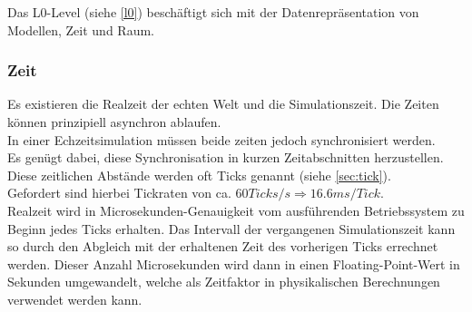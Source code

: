 Das L0-Level (siehe \ref{l0}) beschäftigt sich mit der Datenrepräsentation von Modellen, Zeit und Raum.\\

\subsubsection{Zeit}
Es existieren die Realzeit der echten Welt und die Simulationszeit. Die Zeiten können prinzipiell asynchron ablaufen.\\
In einer Echzeitsimulation müssen beide zeiten jedoch synchronisiert werden.\\
Es genügt dabei, diese Synchronisation in kurzen Zeitabschnitten herzustellen.\\
Diese zeitlichen Abstände werden oft Ticks genannt (siehe \ref{sec:tick}).\\
Gefordert sind hierbei Tickraten von ca. $60 Ticks/s \Rightarrow 16.6ms /Tick$.\\
Realzeit wird in Microsekunden-Genauigkeit vom ausführenden Betriebssystem zu Beginn jedes Ticks erhalten. Das Intervall der vergangenen Simulationszeit kann so durch den Abgleich mit der erhaltenen Zeit des vorherigen Ticks errechnet werden. Dieser Anzahl Microsekunden wird dann in einen Floating-Point-Wert in Sekunden umgewandelt, welche als Zeitfaktor in physikalischen Berechnungen verwendet werden kann.

